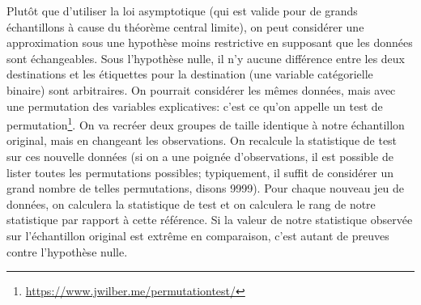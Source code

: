 \documentclass[
  11pt,
  letterpaper,
]{book}
\renewcommand{\href}[2]{#2\footnote{\url{#1}}}
\theoremstyle{definition}
\theoremstyle{definition}
\theoremstyle{definition}
\theoremstyle{remark}
\begin{document}
Plutôt que d'utiliser la loi asymptotique (qui est valide pour de grands échantillons à cause du théorème central limite), on peut considérer une approximation sous une hypothèse moins restrictive en supposant que les données sont échangeables. Sous l'hypothèse nulle, il n'y aucune différence entre les deux destinations et les étiquettes pour la destination (une variable catégorielle binaire) sont arbitraires. On pourrait considérer les mêmes données, mais avec une permutation des variables explicatives: c'est ce qu'on appelle un \href{https://www.jwilber.me/permutationtest/}{test de permutation}. On va recréer deux groupes de taille identique à notre échantillon original, mais en changeant les observations. On recalcule la statistique de test sur ces nouvelle données (si on a une poignée d'observations, il est possible de lister toutes les permutations possibles; typiquement, il suffit de considérer un grand nombre de telles permutations, disons 9999). Pour chaque nouveau jeu de données, on calculera la statistique de test et on calculera le rang de notre statistique par rapport à cette référence. Si la valeur de notre statistique observée sur l'échantillon original est extrême en comparaison, c'est autant de preuves contre l'hypothèse nulle.
\end{document}
